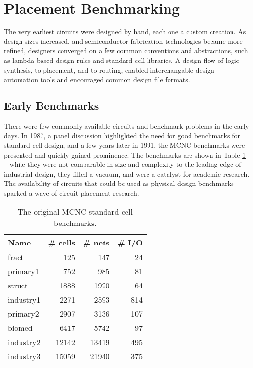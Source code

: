 \documentclass[sigconf]{acmart}
\begin{document}
\section{Placement Benchmarking}

The very earliest circuits were designed by hand, each one a custom
creation. As design sizes increased, and semiconductor fabrication
technologies became more refined, designers converged on a few
common conventions and abstractions, such as lambda-based design rules
and standard cell libraries\cite{Mead93}.  A design flow of logic
synthesis, to placement, and to routing, enabled interchangable
design automation tools and encouraged common design file formats.





\subsection{Early Benchmarks}


There were few commonly available circuits and benchmark problems in
the early days.  In 1987, a panel discussion\cite{Preas87} highlighted
the need for good benchmarks for standard cell design, and a few years
later in 1991, the MCNC benchmarks\cite{Kozminski91} were presented
and quickly gained prominence.  The benchmarks are shown in Table
\ref{tab:mcnc} -- while they were not comparable in size and
complexity to the leading edge of industrial design, they filled a
vacuum, and were a catalyst for academic research.  The availability
of circuits that could be used as physical design benchmarks sparked a
wave of circuit placement research.

\begin{table}
  \begin{tabular}{|l|r|r|r|} \hline
Name & \# cells & \# nets & \# I/O \\ \hline
    fract   &   125 &   147 & 24 \\ \hline
   primary1 &   752 &   985 & 81 \\ \hline
    struct  &  1888 &  1920 & 64 \\ \hline
  industry1 &  2271 & 2593 & 814 \\ \hline
  primary2 & 2907 & 3136 & 107 \\ \hline
  biomed & 6417 & 5742 & 97 \\ \hline
  industry2 & 12142 & 13419 & 495 \\ \hline
  industry3 & 15059 & 21940 & 375 \\ \hline
  \end{tabular}
  \caption{The original MCNC standard cell
    benchmarks\cite{Kozminski91}.}\label{tab:mcnc}
\end{table}
\end{document}
